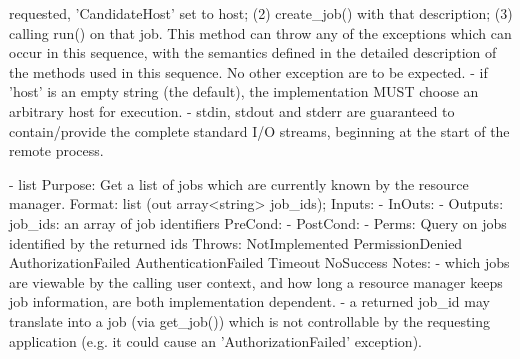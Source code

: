 \begin{myspec}
                  requested, 'CandidateHost' set to host; (2)
                  create_job() with that description; (3)
                  calling run() on that job.  This method can
                  throw any of the exceptions which can occur in
                  this sequence, with the semantics defined in
                  the detailed description of the methods used
                  in this sequence.  No other exception are to
                  be expected.
                - if 'host' is an empty string (the default),
                  the implementation MUST choose an arbitrary
                  host for execution.
                - stdin, stdout and stderr are guaranteed to
                  contain/provide the complete standard I/O
                  streams, beginning at the start of the remote
                  process.
 
 
    - list
      Purpose:  Get a list of jobs which are currently known by
                the resource manager.
      Format:   list              (out array<string>   job_ids);
      Inputs:   -
      InOuts:   -
      Outputs:  job_ids:           an array of job identifiers
      PreCond:  -
      PostCond: -
      Perms:    Query on jobs identified by the returned ids
      Throws:   NotImplemented
                PermissionDenied
                AuthorizationFailed
                AuthenticationFailed
                Timeout
                NoSuccess
      Notes:    - which jobs are viewable by the calling user 
                  context, and how long a resource manager keeps 
                  job information, are both implementation 
                  dependent.
                - a returned job_id may translate into a job 
                  (via get_job()) which is not controllable by 
                  the requesting application (e.g. it could 
                  cause an 'AuthorizationFailed' exception).
 

\end{myspec}
